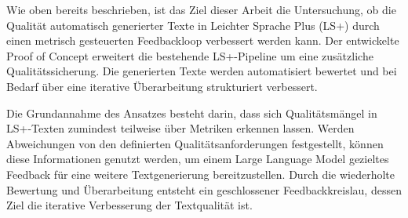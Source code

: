 
Wie oben bereits beschrieben, ist das Ziel dieser Arbeit die Untersuchung, ob die Qualität automatisch generierter Texte in Leichter Sprache Plus (LS+) durch einen metrisch gesteuerten Feedbackloop verbessert werden kann.
Der entwickelte Proof of Concept erweitert die bestehende LS+-Pipeline um eine zusätzliche Qualitätssicherung.
Die generierten Texte werden automatisiert bewertet und bei Bedarf über eine iterative Überarbeitung  strukturiert verbessert.

Die Grundannahme des Ansatzes besteht darin, dass sich Qualitätsmängel in LS+-Texten zumindest teilweise über Metriken erkennen lassen.
Werden Abweichungen von den definierten Qualitätsanforderungen festgestellt, können diese Informationen genutzt werden, um einem Large Language Model gezieltes Feedback für eine weitere Textgenerierung bereitzustellen.
Durch die wiederholte Bewertung und Überarbeitung entsteht ein geschlossener Feedbackkreislau, dessen Ziel die iterative Verbesserung der Textqualität ist.